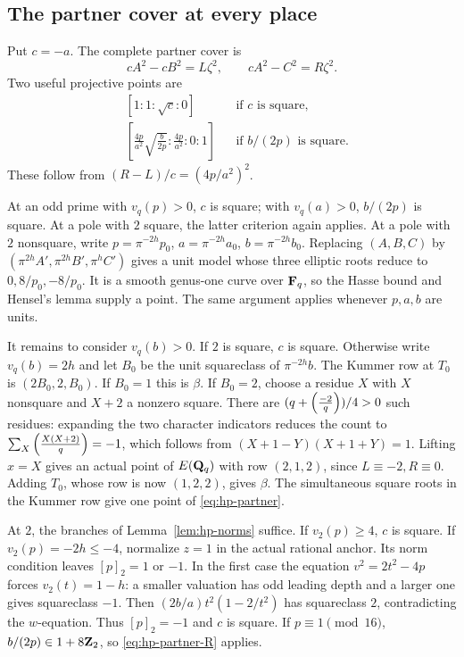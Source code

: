 \subsection{The partner cover at every place}

Put $c=-a$.  The complete partner cover is
\begin{equation}\label{eq:hp-partner}
 cA^2-cB^2=L\zeta^2,\qquad cA^2-C^2=R\zeta^2.
\end{equation}
Two useful projective points are
\begin{align}
 &[1:1:\sqrt c:0] &&\text{if $c$ is square},\label{eq:hp-partner-O}\\
 &\left[\frac{4p}{a^2}\sqrt{\frac b{2p}}:\frac{4p}{a^2}:0:1\right]
 &&\text{if $b/(2p)$ is square}.\label{eq:hp-partner-R}
\end{align}
These follow from $(R-L)/c=(4p/a^2)^2$.

At an odd prime with $v_q(p)>0$, $c$ is square; with $v_q(a)>0$,
$b/(2p)$ is square.  At a pole with $2$ square, the latter criterion
again applies.  At a pole with $2$ nonsquare, write
$p=\pi^{-2h}p_0$, $a=\pi^{-2h}a_0$, $b=\pi^{-2h}b_0$.
Replacing $(A,B,C)$ by $(\pi^{2h}A',\pi^{2h}B',\pi^hC')$ gives a
unit model whose three elliptic roots reduce to $0,8/p_0,-8/p_0$.
It is a smooth genus-one curve over $\mathbf F_q$, so the Hasse bound and
Hensel's lemma supply a point.  The same argument applies whenever
$p,a,b$ are units.

It remains to consider $v_q(b)>0$.  If $2$ is square, $c$ is square.
Otherwise write $v_q(b)=2h$ and let $B_0$ be the unit squareclass of
$\pi^{-2h}b$.  The Kummer row at $T_0$ is $(2B_0,2,B_0)$.
If $B_0=1$ this is $\beta$.  If $B_0=2$, choose a residue $X$ with
$X$ nonsquare and $X+2$ a nonzero square.  There are
$(q+\left(\frac{-2}{q}\right))/4>0$ such residues: expanding the two character
indicators reduces the count to
$\sum_X\left(\frac{X(X+2)}{q}\right)=-1$, which follows from
$(X+1-Y)(X+1+Y)=1$.
Lifting $x=X$ gives an actual point of $E(\mathbf Q_q)$ with row $(2,1,2)$,
since $L\equiv-2,R\equiv0$.  Adding $T_0$, whose row is now $(1,2,2)$,
gives $\beta$.  The simultaneous square roots in the Kummer row give
one point of \eqref{eq:hp-partner}.

At $2$, the branches of Lemma~\ref{lem:hp-norms} suffice.
If $v_2(p)\ge4$, $c$ is square.  If $v_2(p)=-2h\le-4$, normalize
$z=1$ in the actual rational anchor.  Its norm condition leaves
$[p]_2=1$ or $-1$.  In the first case the equation
$v^2=2t^2-4p$ forces $v_2(t)=1-h$: a smaller valuation has odd leading
depth and a larger one gives squareclass $-1$.
Then $(2b/a)t^2(1-2/t^2)$ has squareclass $2$, contradicting the
$w$-equation.  Thus $[p]_2=-1$ and $c$ is square.
If $p\equiv1\pmod {16}$, $b/(2p)\in1+8\mathbf Z_2$, so
\eqref{eq:hp-partner-R} applies.

